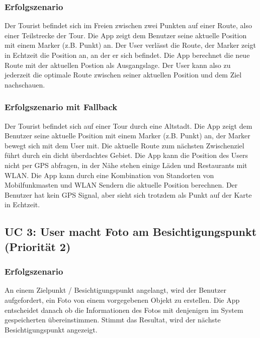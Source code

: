 \documentclass[ngerman,]{article}
\begin{document}
\subsubsection{Erfolgszenario}\label{erfolgszenario}

Der Tourist befindet sich im Freien zwischen zwei Punkten auf einer
Route, also einer Teilstrecke der Tour. Die App zeigt dem Benutzer seine
aktuelle Position mit einem Marker (z.B. Punkt) an. Der User verlässt
die Route, der Marker zeigt in Echtzeit die Position an, an der er sich
befindet. Die App berechnet die neue Route mit der aktuellen Postion als
Ausgangslage. Der User kann also zu jederzeit die optimale Route
zwischen seiner aktuellen Position und dem Ziel nachschauen.

\subsubsection{Erfolgszenario mit
Fallback}\label{erfolgszenario-mit-fallback}

Der Tourist befindet sich auf einer Tour durch eine Altstadt. Die App
zeigt dem Benutzer seine aktuelle Position mit einem Marker (z.B. Punkt)
an, der Marker bewegt sich mit dem User mit. Die aktuelle Route zum
nächsten Zwischenziel führt durch ein dicht überdachtes Gebiet. Die App
kann die Position des Users nicht per GPS abfragen, in der Nähe stehen
einige Läden und Restaurants mit WLAN. Die App kann durch eine
Kombination von Standorten von Mobilfunkmasten und WLAN Sendern die
aktuelle Position berechnen. Der Benutzer hat kein GPS Signal, aber
sieht sich trotzdem als Punkt auf der Karte in Echtzeit.

\subsection{UC 3: User macht Foto am Besichtigungspunkt (Priorität
2)}\label{uc-3-user-macht-foto-am-besichtigungspunkt-priorituxe4t-2}

\subsubsection{Erfolgszenario}\label{erfolgszenario-1}

An einem Zielpunkt / Besichtigungspunkt angelangt, wird der Benutzer
aufgefordert, ein Foto von einem vorgegebenen Objekt zu erstellen. Die
App entscheidet danach ob die Informationen des Fotos mit denjenigen im
System gespeicherten übereinstimmen. Stimmt das Resultat, wird der
nächste Besichtigungspunkt angezeigt.
\end{document}
